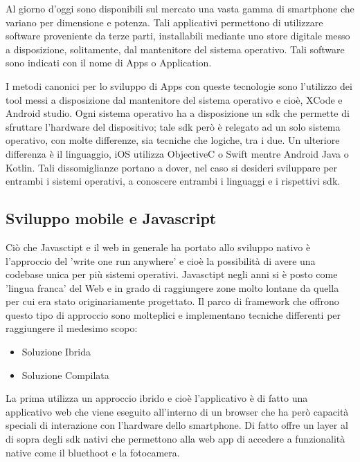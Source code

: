 Al giorno d'oggi sono disponibili sul mercato una vasta gamma di smartphone che variano per dimensione e potenza. Tali applicativi permettono di utilizzare software proveniente da terze parti, installabili mediante uno store digitale messo a disposizione, solitamente, dal mantenitore del sistema operativo. Tali software sono indicati con il nome di Apps o Application.\vspace{5mm}

I metodi canonici per lo sviluppo di Apps con queste tecnologie sono l'utilizzo dei tool messi a disposizione dal mantenitore del sistema operativo e cioè, XCode e Android studio. Ogni sistema operativo ha a disposizione un sdk che permette di sfruttare l'hardware del dispositivo; tale sdk però è relegato ad un solo sistema operativo, con molte differenze, sia tecniche che logiche, tra i due. Un ulteriore differenza è il linguaggio, iOS utilizza ObjectiveC o Swift mentre Android Java o Kotlin. Tali dissomiglianze portano a dover, nel caso si desideri sviluppare per entrambi i sistemi operativi, a conoscere entrambi i linguaggi e i rispettivi sdk.\vspace{5mm}

\subsection{Sviluppo mobile e Javascript}\vspace{5mm}

Ciò che Javasctipt e il web in generale ha portato allo sviluppo nativo è l'approccio del 'write one run anywhere' e cioè la possibilità di avere una codebase unica per più sistemi operativi. Javasctipt negli anni si è posto come 'lingua franca' del Web e in grado di raggiungere zone molto lontane da quella per cui era stato originariamente progettato. Il parco di framework che offrono questo tipo di approccio sono molteplici e implementano tecniche differenti per raggiungere il medesimo scopo:
\begin{itemize}
\item Soluzione Ibrida
\item Soluzione Compilata
\end{itemize}

La prima utilizza un approccio ibrido e cioè l'applicativo è di fatto una applicativo web che viene eseguito all'interno di un browser che ha però capacità speciali di interazione con l'hardware dello smartphone. Di fatto offre un layer al di sopra degli sdk nativi che permettono alla web app di accedere a funzionalità native come il bluethoot e la fotocamera.\vspace{5mm}

